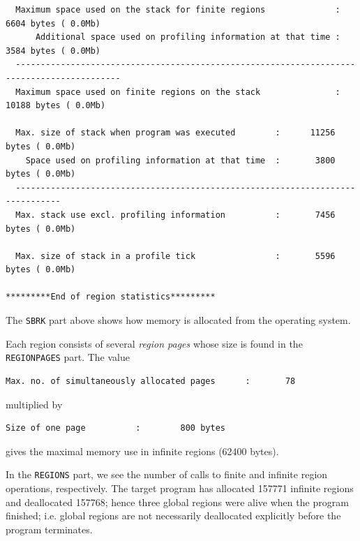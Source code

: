 \documentclass[12pt]{book}
\begin{document}
\begin{scriptsize}
\begin{verbatim}
  Maximum space used on the stack for finite regions              :       6604 bytes ( 0.0Mb)
      Additional space used on profiling information at that time :       3584 bytes ( 0.0Mb)
  -------------------------------------------------------------------------------------------
  Maximum space used on finite regions on the stack               :      10188 bytes ( 0.0Mb)

  Max. size of stack when program was executed        :      11256 bytes ( 0.0Mb)
    Space used on profiling information at that time  :       3800 bytes ( 0.0Mb)
  -------------------------------------------------------------------------------
  Max. stack use excl. profiling information          :       7456 bytes ( 0.0Mb)

  Max. size of stack in a profile tick                :       5596 bytes ( 0.0Mb)

*********End of region statistics*********
\end{verbatim}
\end{scriptsize}
\noindent
The {\tt SBRK} part above shows how memory is allocated from the operating
system.

Each region consists of several 
% 
\emph{region pages} whose size is found in the {\tt REGIONPAGES} part.
The value
\begin{footnotesize}
\begin{verbatim}
Max. no. of simultaneously allocated pages      :       78
\end{verbatim}
\end{footnotesize}
\noindent 
multiplied by
\begin{footnotesize}
\begin{verbatim}
Size of one page          :        800 bytes
\end{verbatim}
\end{footnotesize}
\noindent 
gives the maximal memory use in infinite regions (62400 bytes).

In the {\tt REGIONS} part, we see the number of calls to finite and
infinite region operations, respectively. The target program has allocated
157771 infinite regions and deallocated 157768; hence three global regions were
alive when the program finished; i.e. global regions are not
necessarily deallocated explicitly before the program terminates.
\end{document}
